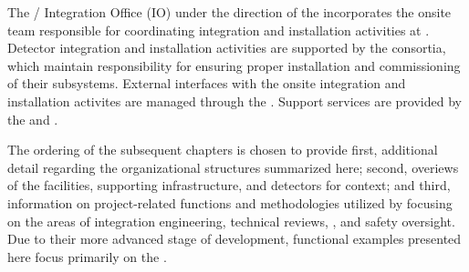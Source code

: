The / Integration Office (IO) under the 
direction of the  incorporates the onsite team responsible 
for coordinating integration and installation activities at .
Detector integration and installation activities are supported by the
 consortia, which maintain responsibility for ensuring
proper installation and commissioning of their subsystems.  External
 interfaces with the onsite integration and installation
activites are managed through the . Support services are
provided by the  and .

The ordering of the subsequent chapters is chosen to provide first,  
additional detail regarding the organizational structures summarized 
here; second, overiews of the facilities, supporting infrastructure, 
and detectors for context; and third, information on project-related 
functions and methodologies utilized by   
focusing on the areas of integration engineering, technical reviews, 
, and safety oversight.  Due to their more advanced stage 
of development, functional examples presented here focus primarily on 
the  .
